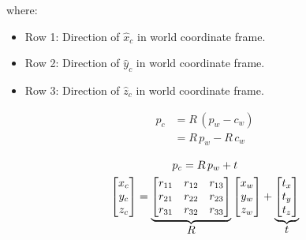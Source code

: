 \noindent where:
\begin{itemize}
    \item Row 1: Direction of $\hat{x}_c$ in world coordinate frame.
    \item Row 2: Direction of $\hat{y}_c$ in world coordinate frame.
    \item Row 3: Direction of $\hat{z}_c$ in world coordinate frame.
\end{itemize}

\noindent

\begin{subequations}
    \begin{align}
        p_c & = R\,(p_w-c_w)   \\
            & = R\,p_w -R\,c_w
    \end{align}
\end{subequations}



\begin{gather}
    p_c = R\,p_w + t \\
    \begin{bmatrix}
        x_c \\ y_c \\ z_c
    \end{bmatrix}
    =
    \underbrace{
        \begin{bmatrix}
            r_{11} & r_{12} & r_{13} \\
            r_{21} & r_{22} & r_{23} \\
            r_{31} & r_{32} & r_{33}
        \end{bmatrix}
    }_{\mathlarger{R}}
    \begin{bmatrix}
        x_w \\ y_w \\ z_w
    \end{bmatrix}
    +
    \underbrace{
        \begin{bmatrix}
            t_x \\ t_y \\ t_z
        \end{bmatrix}
    }_{\mathlarger{t}}
\end{gather}


